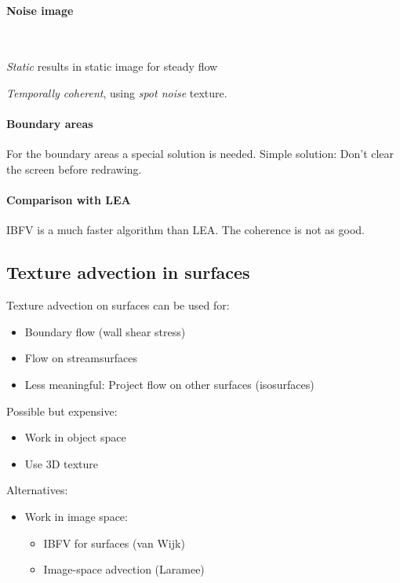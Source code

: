 \paragraph{Noise image}$\ $
\begin{description}
    \item \emph{Static} results in static image for steady flow
    \item \emph{Temporally coherent}, using \emph{spot noise} texture.
\end{description}

\paragraph{Boundary areas} For the boundary areas a special solution is needed. Simple solution: Don't clear the screen before redrawing. 

\paragraph{Comparison with LEA} IBFV is a much faster algorithm than LEA. The coherence is not as good.

\subsection{Texture advection in surfaces}
Texture advection on surfaces can be used for:
\begin{itemize}
    \item Boundary flow (wall shear stress)
    \item Flow on streamsurfaces
    \item Less meaningful: Project flow on other surfaces (isosurfaces)
\end{itemize}

Possible but expensive:
\begin{itemize}
    \item Work in object space
    \item Use 3D texture
\end{itemize}

Alternatives:
\begin{itemize}
    \item Work in image space:
        \begin{itemize}
            \item IBFV for surfaces (van Wijk)
            \item Image-space advection (Laramee)
        \end{itemize}
\end{itemize}

